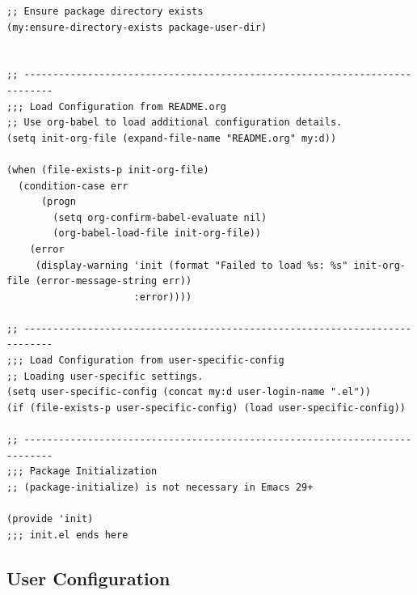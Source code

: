 \documentclass[11pt]{article}
\begin{document}
\begin{verbatim}
;; Ensure package directory exists
(my:ensure-directory-exists package-user-dir)


;; ---------------------------------------------------------------------------
;;; Load Configuration from README.org
;; Use org-babel to load additional configuration details.
(setq init-org-file (expand-file-name "README.org" my:d))

(when (file-exists-p init-org-file)
  (condition-case err
      (progn
        (setq org-confirm-babel-evaluate nil)
        (org-babel-load-file init-org-file))
    (error
     (display-warning 'init (format "Failed to load %s: %s" init-org-file (error-message-string err))
                      :error))))

;; ---------------------------------------------------------------------------
;;; Load Configuration from user-specific-config
;; Loading user-specific settings.
(setq user-specific-config (concat my:d user-login-name ".el"))
(if (file-exists-p user-specific-config) (load user-specific-config))

;; ---------------------------------------------------------------------------
;;; Package Initialization
;; (package-initialize) is not necessary in Emacs 29+

(provide 'init)
;;; init.el ends here
\end{verbatim}
\subsection{User Configuration}
\label{sec:orge8ea53f}
\end{document}
